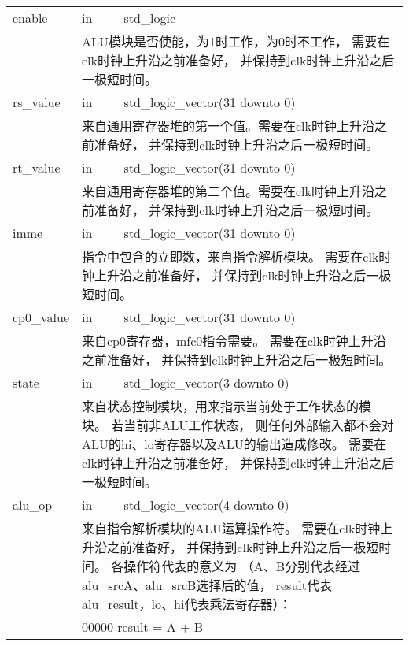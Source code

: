 \begin{tabularx}{\textwidth}{lll}
            enable          & in       & std\_logic \\
            \cmidrule(l){2-3}
            & 
            \multicolumn{2}{X}{
            ALU模块是否使能，为1时工作，为0时不工作，%
            需要在clk时钟上升沿之前准备好，%
            并保持到clk时钟上升沿之后一极短时间。} \\
            \midrule
            rs\_value        & in       & std\_logic\_vector(31 downto 0) \\
            \cmidrule(l){2-3}
            &
            \multicolumn{2}{X}{
            来自通用寄存器堆的第一个值。需要在clk时钟上升沿之前准备好，%
            并保持到clk时钟上升沿之后一极短时间。} \\
            \midrule
            rt\_value        & in       & std\_logic\_vector(31 downto 0) \\
            \cmidrule(l){2-3}
            & 
            \multicolumn{2}{X}{
            来自通用寄存器堆的第二个值。需要在clk时钟上升沿之前准备好，%
            并保持到clk时钟上升沿之后一极短时间。} \\
            \midrule
            imme            & in       & std\_logic\_vector(31 downto 0) \\
            \cmidrule(l){2-3}
            &
            \multicolumn{2}{X}{
            指令中包含的立即数，来自指令解析模块。%
            需要在clk时钟上升沿之前准备好，%
            并保持到clk时钟上升沿之后一极短时间。} \\
            \midrule
            cp0\_value      & in       & std\_logic\_vector(31 downto 0) \\
            \cmidrule(l){2-3}
            &
            \multicolumn{2}{X}{
            来自cp0寄存器，mfc0指令需要。%
            需要在clk时钟上升沿之前准备好，%
            并保持到clk时钟上升沿之后一极短时间。} \\
            \midrule
            state           & in       & std\_logic\_vector(3 downto 0) \\
            \cmidrule(l){2-3}
            &
            \multicolumn{2}{X}{
            来自状态控制模块，用来指示当前处于工作状态的模块。%
            若当前非ALU工作状态，%
            则任何外部输入都不会对ALU的hi、lo寄存器以及ALU的输出造成修改。%
            需要在clk时钟上升沿之前准备好，%
            并保持到clk时钟上升沿之后一极短时间。} \\
            \midrule
            alu\_op         & in       & std\_logic\_vector(4 downto 0) \\
            \cmidrule(l){2-3}
            &
            \multicolumn{2}{X}{
            来自指令解析模块的ALU运算操作符。%
            需要在clk时钟上升沿之前准备好，%
            并保持到clk时钟上升沿之后一极短时间。%
            各操作符代表的意义为%
            （A、B分别代表经过alu\_srcA、alu\_srcB选择后的值，%
            result代表alu\_result，lo、hi代表乘法寄存器）：%
            } \\
            &
            \multicolumn{2}{X}{
            00000 result = A + B

}
\end{tabularx}
